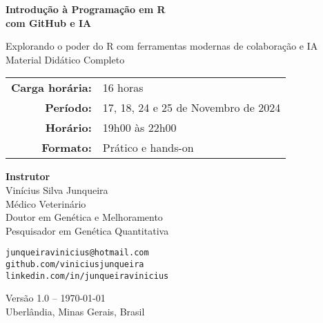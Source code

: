 \documentclass[12pt,a4paper]{article}
\begin{document}
\begin{titlepage}
  \thispagestyle{empty}
  \centering


  \vspace*{2cm}

  {\Huge\bfseries Introdução à Programação em R\\[0.5cm]
  com GitHub e IA\\[1.5cm]
  }

  {\Large Explorando o poder do R com ferramentas modernas de colaboração e IA\\[0.5cm]
  Material Didático Completo\\[2cm]}

  \begin{tabular}{rl}
    \textbf{Carga horária:} & 16 horas \\[0.2cm]
    \textbf{Período:} & 17, 18, 24 e 25 de Novembro de 2024 \\[0.2cm]
    \textbf{Horário:} & 19h00 às 22h00 \\[0.2cm]
    \textbf{Formato:} & Prático e hands-on \\[0.2cm]
  \end{tabular}

  \vfill

  {\large
  \textbf{Instrutor}\\[0.3cm]
  Vinícius Silva Junqueira\\[0.2cm]
  \small
  Médico Veterinário\\
  Doutor em Genética e Melhoramento\\
  Pesquisador em Genética Quantitativa\\[0.5cm]
  }

  {\footnotesize
  \texttt{junqueiravinicius@hotmail.com}\\
  \texttt{github.com/viniciusjunqueira}\\
  \texttt{linkedin.com/in/junqueiravinicius}\\[1cm]
  }

  {\small
  Versão 1.0 -- \today\\
  Uberlândia, Minas Gerais, Brasil
  }

\end{titlepage}
\end{document}
